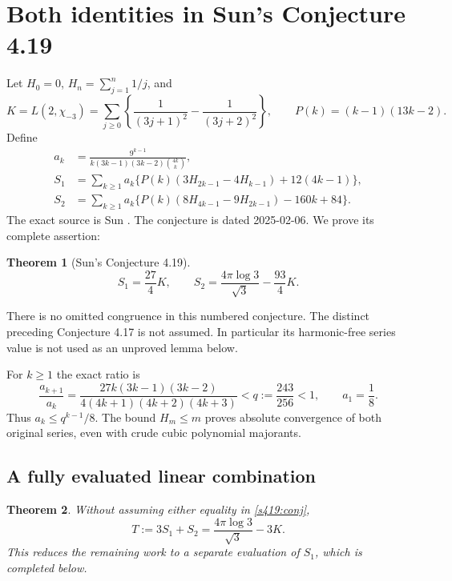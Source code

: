 \documentclass[11pt,a4paper]{article}
\newtheorem{theorem}{Theorem}[section]
\theoremstyle{remark}\newtheorem{remark}[theorem]{Remark}
\numberwithin{equation}{section}
\begin{document}
\section{Both identities in Sun's Conjecture 4.19}\label{s419:sec:sun419-complete}
Let $H_0=0$, $H_n=\sum_{j=1}^n1/j$, and
\[
 K=L(2,\chi_{-3})=\sum_{j\ge0}\left\{\frac1{(3j+1)^2}-\frac1{(3j+2)^2}\right\},
 \qquad P(k)=(k-1)(13k-2).
\]
Define
\begin{align}
 a_k&=\frac{9^{k-1}}{k(3k-1)(3k-2)\binom{4k}{k}},\label{s419:ak}\\
 S_1&=\sum_{k\ge1}a_k\{P(k)(3H_{2k-1}-4H_{k-1})+12(4k-1)\},\label{s419:S1}\\
 S_2&=\sum_{k\ge1}a_k\{P(k)(8H_{4k-1}-9H_{2k-1})-160k+84\}.\label{s419:S2}
\end{align}
The exact source is Sun \cite[v10, p.~20, Conjecture 4.19, (4.21)--(4.22)]{Sun}.
The conjecture is dated 2025-02-06. We prove its complete assertion:
\begin{theorem}[Sun's Conjecture 4.19]\label{s419:thm:sun419-complete}
\begin{equation}\label{s419:conj}
 S_1=\frac{27}4K,\qquad
 S_2=\frac{4\pi\log3}{\sqrt3}-\frac{93}4K.
\end{equation}
\end{theorem}
There is no omitted congruence in this numbered conjecture. The distinct
preceding Conjecture 4.17 is not assumed. In particular its harmonic-free
series value is not used as an unproved lemma below.

For $k\ge1$ the exact ratio is
\[
 \frac{a_{k+1}}{a_k}
 =\frac{27k(3k-1)(3k-2)}{4(4k+1)(4k+2)(4k+3)}<q:=\frac{243}{256}<1,
 \qquad a_1=\frac18.
\]
Thus $a_k\le q^{k-1}/8$. The bound $H_m\le m$ proves absolute convergence
of both original series, even with crude cubic polynomial majorants.

\subsection{A fully evaluated linear combination}
\begin{theorem}\label{s419:relation}
Without assuming either equality in \eqref{s419:conj},
\begin{equation}\label{s419:Tvalue}
 T:=3S_1+S_2=\frac{4\pi\log3}{\sqrt3}-3K.
\end{equation}
This reduces the remaining work to a separate evaluation of $S_1$, which is completed below.
\end{theorem}
\end{document}
